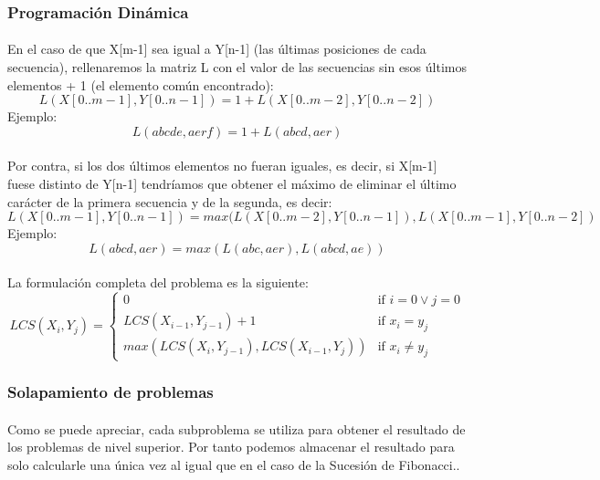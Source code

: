 \documentclass{article}
\begin{document}
	\subsubsection{Programación Dinámica}

		\paragraph{}
		En el caso de que X[m-1] sea igual a Y[n-1] (las últimas posiciones de cada secuencia), rellenaremos la matriz L con el valor de las secuencias sin esos últimos elementos + 1 (el elemento común encontrado):
		\[
		L(X[0..m-1], Y[0..n-1]) = 1 + L(X[0..m-2], Y[0..n-2])
		\]
		\newline{}
		Ejemplo: 
		\[
		L(abcde, aerf) = 1 + L(abcd, aer)
		\]

		\paragraph{}
		Por contra, si los dos últimos elementos no fueran iguales, es decir, si X[m-1] fuese distinto de Y[n-1] tendríamos que obtener el máximo de eliminar el último carácter de la primera secuencia y de la segunda, es decir:
		\[
		L(X[0..m-1], Y[0..n-1]) = max(L(X[0..m-2], Y[0..n-1]), L(X[0..m-1], Y[0..n-2])
		\]
		\newline{}
		Ejemplo: 
		\[
		L(abcd, aer) = max( L(abc, aer), L(abcd, ae) )
		\]
		\paragraph{}
		
		La formulación completa del problema es la siguiente:
		\[
   		 LCS( X_{i}, Y_{j} ) = 
			\begin{cases}
			    	0									& \text{if } i = 0 \vee	 j = 0\\
    				LCS( X_{i-1}, Y_{j-1}) + 1					& \text{if } x_{i} = y_{j}\\
    				max(LCS( X_{i}, Y_{j-1}), LCS( X_{i-1}, Y_{j}))	& \text{if } x_{i} \not = y_{j}
			\end{cases}
		\]
		
	\subsubsection{Solapamiento de problemas}
		\paragraph{}
		Como se puede apreciar, cada subproblema se utiliza para obtener el resultado de los problemas de nivel superior. Por tanto podemos almacenar el resultado para solo calcularle una única vez al igual que en el caso de la Sucesión de Fibonacci..
\end{document}
